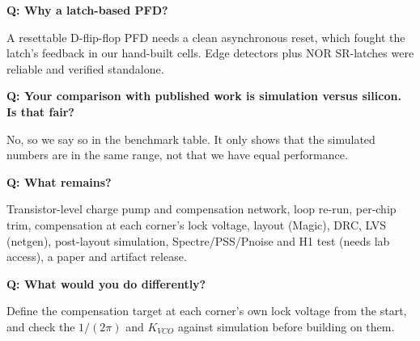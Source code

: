 \documentclass[11pt,a4paper]{article}
\newcommand{\qa}[2]{\par\smallskip\noindent\textbf{Q: #1}\par\noindent\hspace*{1em}\begin{minipage}[t]{\dimexpr\linewidth-1em}#2\end{minipage}\par}
\begin{document}
\qa{Why a latch-based PFD?}{A resettable D-flip-flop PFD needs a clean asynchronous reset, which fought the latch's feedback in our hand-built cells. Edge detectors plus NOR SR-latches were reliable and verified standalone.}

\qa{Your comparison with published work is simulation versus silicon. Is that fair?}{No, so we say so in the benchmark table. It only shows that the simulated numbers are in the same range, not that we have equal performance.}

\qa{What remains?}{Transistor-level charge pump and compensation network, loop re-run, per-chip trim, compensation at each corner's lock voltage, layout (Magic), DRC, LVS (netgen), post-layout simulation, Spectre/PSS/Pnoise and H1 test (needs lab access), a paper and artifact release.}

\qa{What would you do differently?}{Define the compensation target at each corner's own lock voltage from the start, and check the $1/(2\pi)$ and $K_{VCO}$ against simulation before building on them.}

\end{document}
